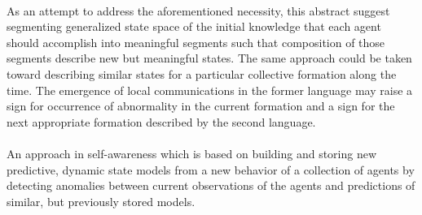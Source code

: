 \documentclass{article}
\begin{document}
	\paragraph{} As an attempt to address the aforementioned necessity, this abstract suggest segmenting generalized state space of the initial knowledge that each agent should accomplish into meaningful segments such that composition of those segments describe new but meaningful states. The same approach could be taken toward describing similar states for a particular collective formation along the time. The emergence of local communications in the former language may raise a sign for occurrence of abnormality in the current formation and a sign for the next appropriate formation described by the second language. 
	
	\paragraph{} An approach in self-awareness which is based on building and storing new predictive, dynamic state models from a new behavior of a collection of agents by detecting anomalies between current observations of the agents and predictions of similar, but previously stored models. 
	
	
\end{document}

